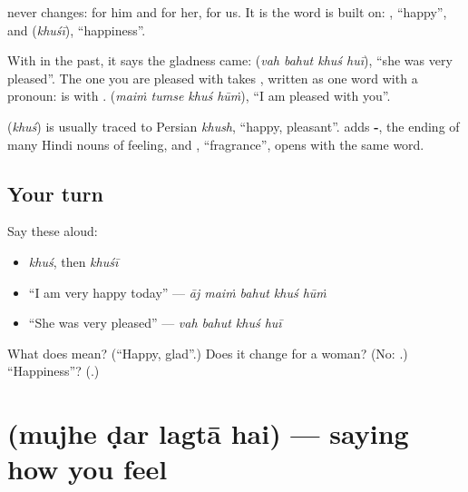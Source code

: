 \textbf{} never changes: \textbf{  } for him and for her, \textbf{  } for us. It is the word \textbf{} is built on: \textbf{}, \textquotedblleft{}happy\textquotedblright{}, and \textbf{} (\emph{khuśī}), \textquotedblleft{}happiness\textquotedblright{}.

With \textbf{} in the past, it says the gladness came: \textbf{   } (\emph{vah bahut khuś huī}), \textquotedblleft{}she was very pleased\textquotedblright{}. The one you are pleased with takes \textbf{}, written as one word with a pronoun: \textbf{} is \textbf{} with \textbf{}. \textbf{   } (\emph{maiṁ tumse khuś hūṁ}), \textquotedblleft{}I am pleased with you\textquotedblright{}.

\begin{cousinweb}
\textbf{} (\emph{khuś}) is usually traced to Persian \emph{khush}, \textquotedblleft{}happy, pleasant\textquotedblright{}. \textbf{} adds \textbf{-}, the ending of many Hindi nouns of feeling, and \textbf{}, \textquotedblleft{}fragrance\textquotedblright{}, opens with the same word.
\end{cousinweb}

\subsection*{Your turn}
Say these aloud:

\begin{itemize}
\raggedright
  \item \emph{khuś}, then \emph{khuśī}
  \item \textquotedblleft{}I am very happy today\textquotedblright{} — \emph{āj maiṁ bahut khuś hūṁ}
  \item \textquotedblleft{}She was very pleased\textquotedblright{} — \emph{vah bahut khuś huī}
\end{itemize}

\begin{tcolorbox}[breakable,colback=teal!4,colframe=teal!35!black,title={Before you move on}]
What does \textbf{} mean? (\textquotedblleft{}Happy, glad\textquotedblright{}.) Does it change for a woman? (No: \textbf{  }.) \textquotedblleft{}Happiness\textquotedblright{}? (\textbf{}.)
\end{tcolorbox}
\section[\texorpdfstring{\hi{मुझे} \hi{डर} \hi{लगता} \hi{है} (mujhe ḍar lagtā hai)}{मुझे डर लगता है (mujhe ḍar lagtā hai)}]{    (mujhe ḍar lagtā hai) — saying how you feel}

